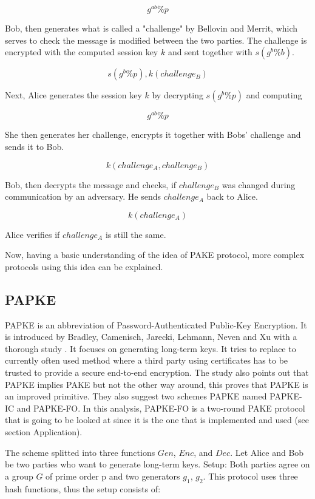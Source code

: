 \documentclass[../main.tex]{subfiles}
\begin{document}
\[g^{ab} \% p\]

Bob, then generates what is called a "challenge" by Bellovin and Merrit, which serves
to check the message is modified between the two parties. The challenge is encrypted
with the computed session key \(k\) and sent together with \(s(g^b \% b)\).

\[s(g^b \% p), k(challenge_B)\]

Next, Alice generates the session key \(k\) by decrypting \(s(g^b \% p)\) and computing

\[g^{ab} \% p\]

She then generates her challenge, encrypts it together with Bobs' challenge
and sends it to Bob. 

\[k(challenge_A, challenge_B)\]

Bob, then decrypts the message and checks, if \(challenge_B\) was changed during
communication by an adversary. He sends \(challenge_A\) back to Alice.

\[k(challenge_A)\]

Alice verifies if \(challenge_A\) is still the same.

Now, having a basic understanding of  the idea of PAKE protocol, more complex protocols
using this idea can be explained.

\subsection{PAPKE}
PAPKE is an abbreviation of Password-Authenticated Public-Key Encryption. It is
introduced by Bradley, Camenisch, Jarecki, Lehmann, Neven and Xu with a thorough
study \cite{bradley2019password}. It focuses on generating long-term keys. It
tries to replace to currently often used method where a third party using
certificates has to be trusted to provide a secure end-to-end encryption. The
study also points out that PAPKE implies PAKE but not the other way around,
this proves that PAPKE is an improved primitive. They also suggest two schemes
PAPKE named PAPKE-IC and PAPKE-FO. In this analysis, PAPKE-FO is a two-round
PAKE protocol that is going to be looked at since it is the one that is
implemented and used (see section Application). 

The scheme splitted into three functions \(Gen\), \(Enc\), and \(Dec\).
Let Alice and Bob be two parties who want to generate long-term keys.
Setup: Both parties agree on a group \(G\) of prime order p and two generators
\(g_1\), \(g_2\). This protocol uses three hash functions, thus the setup
consists of: 
\end{document}
